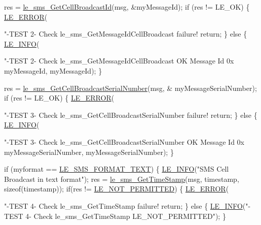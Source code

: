 \begin{DoxyCodeInclude}
{{{{{{{    res = \hyperlink{le__sms__interface_8h_aa28c1d04ff19b88100b766737610b128}{le\_sms\_GetCellBroadcastId}(msg, &myMessageId);
    \textcolor{keywordflow}{if} (res != LE\_OK)
    \{
        \hyperlink{le__log_8h_a353590f91b3143a7ba3a416ae5a50c3d}{LE\_ERROR}(\textcolor{stringliteral}{"-TEST  2- Check le\_sms\_GetMessageIdCellBroadcast failure! %
        \textcolor{keywordflow}{return};
    \}
    \textcolor{keywordflow}{else}
    \{
        \hyperlink{le__log_8h_a23e6d206faa64f612045d688cdde5808}{LE\_INFO}(\textcolor{stringliteral}{"-TEST  2- Check le\_sms\_GetMessageIdCellBroadcast OK Message Id 0x%
            myMessageId, myMessageId);
    \}

    res = \hyperlink{le__sms__interface_8h_aa3e075b4a9396b2e4af233e4543f40bd}{le\_sms\_GetCellBroadcastSerialNumber}(msg, &
      myMessageSerialNumber);
    \textcolor{keywordflow}{if} (res != LE\_OK)
    \{
        \hyperlink{le__log_8h_a353590f91b3143a7ba3a416ae5a50c3d}{LE\_ERROR}(\textcolor{stringliteral}{"-TEST  3- Check le\_sms\_GetCellBroadcastSerialNumber failure! %
        \textcolor{keywordflow}{return};
    \}
    \textcolor{keywordflow}{else}
    \{
        \hyperlink{le__log_8h_a23e6d206faa64f612045d688cdde5808}{LE\_INFO}(\textcolor{stringliteral}{"-TEST  3- Check le\_sms\_GetCellBroadcastSerialNumber OK Message Id 0x%
            myMessageSerialNumber, myMessageSerialNumber);
    \}

    \textcolor{keywordflow}{if} (myformat == \hyperlink{le__sms__interface_8h_a337778c44e63660c44fa2116699296c0a1bb6a0d76a622b1185ee879e1595dff8}{LE\_SMS\_FORMAT\_TEXT})
    \{
        \hyperlink{le__log_8h_a23e6d206faa64f612045d688cdde5808}{LE\_INFO}(\textcolor{stringliteral}{"SMS Cell Broadcast in text format"});
        res = \hyperlink{le__sms__interface_8h_af018ca1bc2085a48e4b6d4691bef3cc7}{le\_sms\_GetTimeStamp}(msg, timestamp, \textcolor{keyword}{sizeof}(timestamp));
        \textcolor{keywordflow}{if}(res != \hyperlink{le__basics_8h_a1cca095ed6ebab24b57a636382a6c86cac6c0cac62213b786dabd7bf3e73bcec1}{LE\_NOT\_PERMITTED})
        \{
            \hyperlink{le__log_8h_a353590f91b3143a7ba3a416ae5a50c3d}{LE\_ERROR}(\textcolor{stringliteral}{"-TEST  4- Check le\_sms\_GetTimeStamp failure! %
            \textcolor{keywordflow}{return};
        \}
        \textcolor{keywordflow}{else}
        \{
            \hyperlink{le__log_8h_a23e6d206faa64f612045d688cdde5808}{LE\_INFO}(\textcolor{stringliteral}{"-TEST  4- Check le\_sms\_GetTimeStamp LE\_NOT\_PERMITTED"});
        \}

}}}}}}}}}}}}
\end{DoxyCodeInclude}
